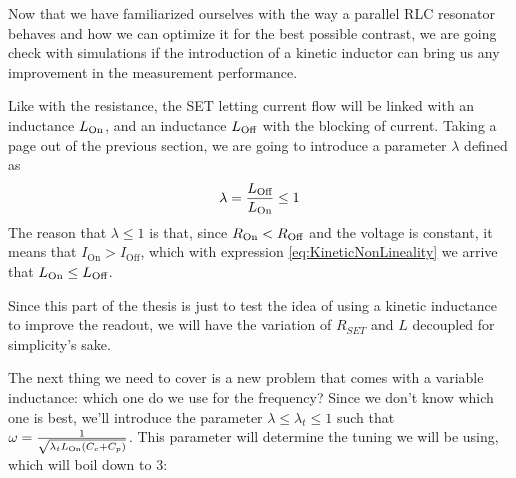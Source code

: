 \documentclass[../main.tex]{subfiles}
\begin{document}
Now that we have familiarized ourselves with the way a parallel RLC resonator
behaves and how we can optimize it for the best possible contrast, we are going
check with simulations if the introduction of a kinetic inductor can bring
us any improvement in the measurement performance.


Like with the resistance, the SET letting current flow will be
linked with an inductance \(L_{\text{On}}\), and an inductance
\(L_{\text{Off}}\) with the blocking of current. Taking a page out of the previous
section, we are going to introduce a parameter \(\lambda\) defined as
\begin{equation*}
\label{eq:LambdaDef}
    \lambda = \frac{L_{\text{Off}}}{L_{\text{On}}} \leq 1
\end{equation*}
The reason that \(\lambda \leq 1\) is that, since
\(R_{\text{On}} < R_{\text{Off}}\) and the voltage is constant, it means that
\(I_{\text{On}} > I_{\text{Off}}\), which with expression
\ref{eq:KineticNonLineality} we arrive that \(L_{\text{On}} \leq L_{\text{Off}}\).

Since this part of the thesis is just to test the idea of using
a kinetic inductance to improve the readout, we will have the variation
of \(R_{SET}\) and \(L\) decoupled for simplicity's sake.

The next thing we need to cover is a new problem that comes with a variable
inductance: which one do we use for the frequency? Since we don't know which
one is best, we'll introduce the parameter \(\lambda \leq \lambda_{t} \leq 1\)
such that \(\omega = \frac{1}{\sqrt{\lambda_{t}L_{\text{On}}(C_{c} + C_{p})}}\).
This parameter will determine the tuning we will be using, which will boil
down to 3:
\end{document}
